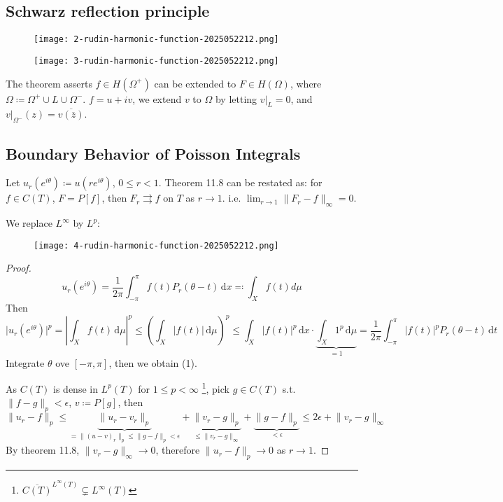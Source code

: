 \subsection{Schwarz reflection principle}

\begin{figure}[H]
\centering
\texttt{[image: 2-rudin-harmonic-function-2025052212.png]}
\label{}
\end{figure}
\begin{figure}[H]
\centering
\texttt{[image: 3-rudin-harmonic-function-2025052212.png]}
\label{}
\end{figure}

The theorem asserts $f\in H(\Omega^{+})$ can be extended to $F\in H(\Omega)$, where $\Omega\coloneqq\Omega^{+}\cup L\cup \Omega^{-}$. $f=u+i v$, we extend $v$ to $\Omega$ by letting $\left.v\right|_{L}=0$, and $\left.v\right|_{\Omega^{-}}(z)=\overline{v(\overline{z})}$.

\subsection{Boundary Behavior of Poisson Integrals}

Let $u_{r}(e^{ i\theta })\coloneqq u(re^{ i\theta })$, $0\leq r<1$. Theorem 11.8 can be restated as: for $f\in C(T)$, $F=P[f]$, then $F_{r}\rightrightarrows f$ on $T$ as $r\to 1$. i.e. $\lim_{ r \to 1 }\lVert F_{r}-f \rVert_{\infty}=0$.

We replace $L^{\infty}$ by $L^{p}$:
\begin{figure}[H]
\centering
\texttt{[image: 4-rudin-harmonic-function-2025052212.png]}
\label{}
\end{figure}

\begin{proof}
\[
u_{r}(e^{ i\theta })=\frac{1}{2\pi}\int_{-\pi}^{\pi} f(t)P_{r}(\theta-t) \, \mathrm{d}x \eqqcolon \int_{X}f(t)d\mu
\]
Then
\[
\lvert u_{r}(e^{ i\theta }) \rvert ^{p}=\left\lvert  \int_{X}^{} f(t) \, \mathrm{d}\mu   \right\rvert ^{p}\leq \left( \int_{X}^{} \lvert f(t) \rvert  \, \mathrm{d}\mu \right)^{p}\leq \int_{X}^{} \lvert f(t) \rvert ^{p} \, \mathrm{d}x\cdot \underbrace{ \int_{X}^{} 1^{p} \, \mathrm{d}\mu }_{ =1 }  =\frac{1}{2\pi}\int_{-\pi}^{\pi} \lvert f(t) \rvert ^{p}P_{r}(\theta-t) \, \mathrm{d}t
\]
Integrate $\theta$ ove $[-\pi,\pi]$, then we obtain (1).

As $C(T)$ is dense in $L^{p}(T)$ for $1\leq p<\infty$ \footnote{$\overline{C(T)}^{L^{\infty}(T)}\subsetneq L^{\infty}(T)$}, pick $g\in C(T)$ s.t. $\lVert f-g \rVert_{p}<\epsilon$, $v\coloneqq P[g]$, then
\[
\lVert u_{r}-f \rVert_{p} \leq \underbrace{ \lVert u_{r}-v_{r} \rVert_{p} }_{ =\lVert (u-v)_{r} \rVert _{p}\leq \lVert g-f \rVert _{p}<\epsilon } +\underbrace{ \lVert v_{r}-g \rVert _{p} }_{ \leq \lVert v_{r}-g \rVert _{\infty} }+\underbrace{ \lVert g-f \rVert _{p} }_{ <\epsilon }\leq 2\epsilon+\lVert v_{r}-g \rVert _{\infty}
\]
By theorem 11.8, $\lVert v_{r}-g \rVert_{\infty}\to0$, therefore $\lVert u_{r}-f \rVert_{p}\to 0$ as $r\to1$.
\end{proof}

